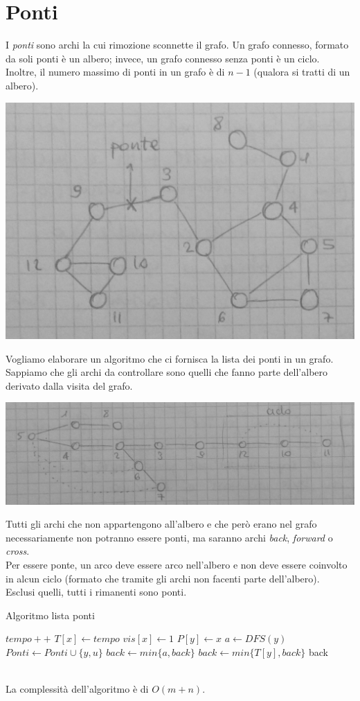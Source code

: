 \section{Ponti}
I \textit{ponti} sono archi la cui rimozione sconnette il grafo. Un grafo connesso, formato da soli ponti è un albero; invece, un grafo connesso senza ponti è un ciclo. \\
Inoltre, il numero massimo di ponti in un grafo è di $n-1$ (qualora si tratti di un albero).
\begin{center}
    \includegraphics[width=.4\textwidth]{res/ponti-grafo.jpg} \hfill
\end{center}
Vogliamo elaborare un algoritmo che ci fornisca la lista dei ponti in un grafo.
Sappiamo che gli archi da controllare sono quelli che fanno parte dell'albero derivato dalla visita del grafo.
\begin{center}
    \includegraphics[width=.6\textwidth]{res/ponti-albero.jpg} \hfill
\end{center}
Tutti gli archi che non appartengono all'albero e che però erano nel grafo necessariamente non potranno essere ponti, ma saranno archi \textit{back}, \textit{forward} o \textit{cross}. \\
Per essere ponte, un arco deve essere arco nell'albero e non deve essere coinvolto in alcun ciclo (formato che tramite gli archi non facenti parte dell'albero). \\
Esclusi quelli, tutti i rimanenti sono ponti.
\begin{algorithm}
	\caption{Algoritmo lista ponti}\label{alg:listaPonti}
	\begin{algorithmic}[1]
		 
		\State $tempo++$
		\State $T[x] \gets tempo$
		\State $vis[x] \gets 1$
				\State $P[y] \gets x$
				\State $a \gets DFS(y)$
					\State $Ponti \gets Ponti \cup \{y,u\}$
				\EndIf
				\State $back \gets min\{a,back\}$
				\State $back \gets min\{T[y],back\}$
			\EndIf
		\EndFor
		\State \Return back
		\EndFunction
	\end{algorithmic}
\end{algorithm} \hfill \\
La complessità dell'algoritmo è di $O(m+n)$.


